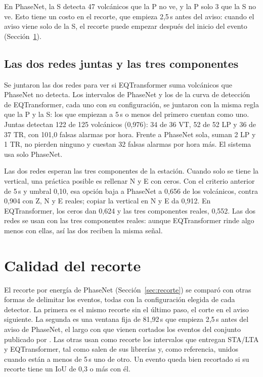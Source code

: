 En PhaseNet, la S detecta 47 volcánicos que la P no ve, y la P solo 3 que la S
no ve. Esto tiene un costo en el recorte, que empieza 2,5\,s antes del aviso:
cuando el aviso viene solo de la S, el recorte puede empezar después del
inicio del evento (Sección~\ref{sec:res-recorte}).

\subsection{Las dos redes juntas y las tres componentes}

Se juntaron las dos redes para ver si EQTransformer suma volcánicos que
PhaseNet no detecta. Los intervalos de PhaseNet y los de la curva de detección
de EQTransformer, cada uno con su configuración, se juntaron con la misma
regla que la P y la S: los que empiezan a 5\,s o menos del primero cuentan
como uno. Juntas detectan 122 de 125 volcánicos (0,976): 34 de 36 VT, 52 de 52
LP y 36 de 37 TR, con 101,0 falsas alarmas por hora. Frente a PhaseNet sola,
suman 2 LP y 1 TR, no pierden ninguno y cuestan 32 falsas alarmas por hora
más. El sistema usa solo PhaseNet.

Las dos redes esperan las tres componentes de la estación. Cuando solo se
tiene la vertical, una práctica posible es rellenar N y E con ceros. Con el
criterio anterior de 5\,s y umbral 0,10, esa opción baja a PhaseNet a 0,656 de
los volcánicos, contra 0,904 con Z, N y E reales; copiar la vertical en N y E
da 0,912. En EQTransformer, los ceros dan 0,624 y las tres componentes reales,
0,552. Las dos redes se usan con las tres componentes reales: aunque
EQTransformer rinde algo menos con ellas, así las dos reciben la misma señal.

\section{Calidad del recorte}
\label{sec:res-recorte}

El recorte por energía de PhaseNet (Sección~\ref{sec:recorte}) se comparó con
otras formas de delimitar los eventos, todas con la configuración elegida de
cada detector. La primera es el mismo recorte sin el último paso, el corte en
el aviso siguiente. La segunda es una ventana fija de 81,92\,s que empieza
2,5\,s antes del aviso de PhaseNet, el largo con que vienen cortados los
eventos del conjunto publicado por \textcite{espinosacurilem2025dataset}. Las
otras usan como recorte los intervalos que entregan STA/LTA y EQTransformer,
tal como salen de sus librerías y, como referencia, unidos cuando están a
menos de 5\,s uno de otro. Un evento queda bien recortado si su recorte tiene
un IoU de 0,3 o más con él.

